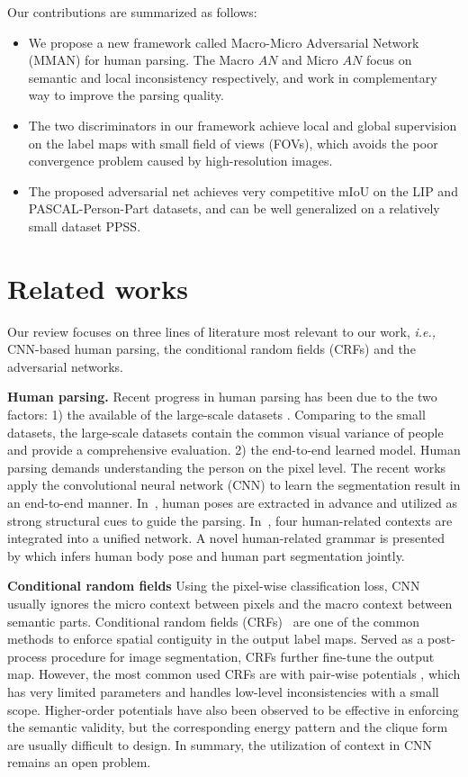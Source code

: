 \documentclass[runningheads]{llncs}
\begin{document}
Our contributions are summarized as follows:
\begin{itemize}
\item We propose a new framework called Macro-Micro Adversarial Network (MMAN) for human parsing. The Macro $AN$ and Micro $AN$ focus on semantic and local inconsistency respectively, and work in complementary way to improve the parsing quality.

\item The two discriminators in our framework achieve local and global supervision on the label maps with small field of views (FOVs), which avoids the poor convergence problem caused by high-resolution images.

\item The proposed adversarial net achieves very competitive mIoU on the LIP and PASCAL-Person-Part datasets, and can be well generalized on a relatively small dataset PPSS.
\end{itemize}

\section{Related works}
Our review focuses on three lines of literature most relevant to our work, \emph{i.e.,} CNN-based human parsing, the conditional random fields (CRFs) and the adversarial networks.

\textbf{Human parsing.}
Recent progress in human parsing has been due to the two factors: 1) the available of the large-scale datasets \cite{gong2017look,liang2015deep,luo2013pedestrian,chen2014detect}. Comparing to the small datasets, the large-scale datasets contain the common visual variance of people and provide a comprehensive evaluation.
2) the end-to-end learned model. Human parsing demands understanding the person on the pixel level. The recent works apply the convolutional neural network (CNN) to learn the segmentation result in an end-to-end manner. In~\cite{xia2016pose}, human poses are extracted in advance and utilized as strong structural cues to guide the parsing. In~\cite{liang2015human}, four human-related contexts are integrated into a unified network. A novel human-related grammar is presented by \cite{park2017attribute} which infers human body pose and human part segmentation jointly.

\textbf{Conditional random fields}
Using the pixel-wise classification loss, CNN usually ignores the micro context between pixels and the macro context between semantic parts.  Conditional random fields (CRFs)~\cite{krahenbuhl2011efficient,liu2015semantic,li2017holistic} are one of the common methods to enforce spatial contiguity in the output label maps. Served as a post-process procedure for image segmentation, CRFs further fine-tune the output map. However, the most common used CRFs are with pair-wise potentials \cite{chen2016deeplab,luo2016accurate}, which has very limited parameters and handles low-level inconsistencies with a small scope. Higher-order potentials \cite{kohli2009robust,li2017holistic} have also been observed to be effective in enforcing the semantic validity, but the corresponding energy pattern and the clique form are usually difficult to design. In summary, the utilization of context in CNN remains an open problem.
\end{document}
